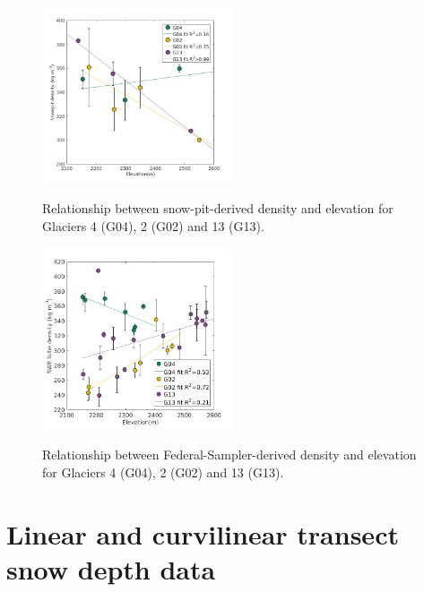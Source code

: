 \documentclass{sfuthesis}
\begin{document}
\begin{figure}[H]
	\centering
	\includegraphics[width = 0.5\textwidth]{ElevationVsSnowpit_all.png}\\
	\caption{Relationship between snow-pit-derived density and elevation for Glaciers 4 (G04), 2 (G02) and 13 (G13).}
	\label{fig:elev_snowpit}
\end{figure}


\begin{figure}[H]
	\centering
	\includegraphics[width = 0.5\textwidth]{ElevationVsSWEtube_all.png}\\
	\caption{Relationship between Federal-Sampler-derived density and elevation for Glaciers 4 (G04), 2 (G02) and 13 (G13).}
	\label{fig:elev_tube}
\end{figure}


\section{Linear and curvilinear transect snow depth data}
\end{document}
